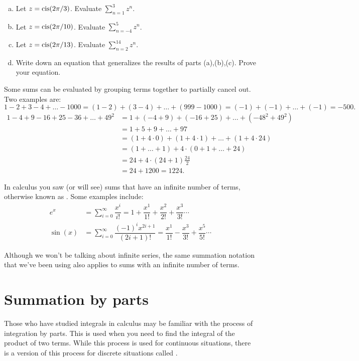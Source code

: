 \begin{exercise}{}
\begin{enumerate}[(a)]
\item
Let $z = \operatorname{cis} (2\pi/3)$.  Evaluate $\sum_{n=1}^3 z^n$.
\item
Let $z = \operatorname{cis} (2\pi/10)$.  Evaluate $\sum_{n=-4}^5 z^n$.
\item
Let $z = \operatorname{cis} (2\pi/13)$.  Evaluate $\sum_{n=2}^{14} z^n$.
\item
Write down an equation that generalizes the results of parts (a),(b),(c).  Prove your equation.  
\end{enumerate}
\end{exercise}


Some sums can be evaluated by grouping terms together to partially cancel out.  Two examples are:
\[
1-2+3-4+\ldots -1000 = (1-2)+(3-4)+\ldots + (999-1000)  = (-1) + (-1) + \ldots + (-1) = -500.
\]
\begin{align*}
1 - 4 + 9 -16 + 25 - 36 + \ldots +49^2 &=  1 + (-4+9) + (-16+25) + \ldots + (-48^2+49^2)\\
& = 1 + 5 + 9 + \ldots + 97\\
& = (1 + 4\cdot 0) + (1 + 4\cdot 1) + \ldots + (1 + 4 \cdot 24) \\
&= (1 + \ldots + 1) + 4\cdot(0 + 1 + \ldots + 24) \\
& = 24 + 4\cdot (24+1)\frac{24}{2}\\
&= 24 + 1200 = 1224.
\end{align*}  

In calculus you saw (or will see) sums that have an infinite number of terms, otherwise known as . Some examples include:
\begin{align*}
e^x &= \sum_{i=0}^{\infty}\dfrac{x^i}{i!} =1+\dfrac{x^1}{1!}+\dfrac{x^2}{2!}+\dfrac{x^3}{3!} \cdots \\
\sin(x) &= \sum_{i=0}^{\infty}\dfrac{(-1)^i x^{2i+1}}{(2i+1)!} = \dfrac{x^1}{1!}-\dfrac{x^3}{3!}+\dfrac{x^5}{5!}\cdots
\end{align*}

Although we won't be talking about infinite series, the same summation notation that we've been using also applies to sums with an infinite number of terms. 


\section{Summation by parts}
\label{sec:SigmaNotation:SumByParts}

Those who have studied integrals in calculus may be familiar with the process of integration by parts.  This is used when you need to find the integral of the product of two terms.  While this process is used for continuous situations, there is a version of this process for discrete situations called .  

